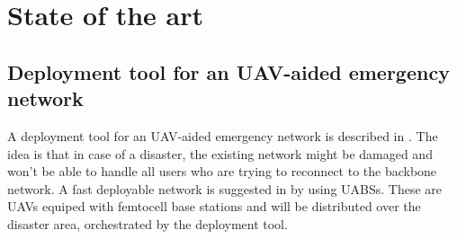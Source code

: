 \chapter{State of the art}
\label{chap:stateoftheart}

\section{Deployment tool for an UAV-aided emergency network}
\label{chap:stateoftheart:deploymenttool}


A deployment tool for an UAV-aided emergency network is described in \cite{J2}. The idea is that in case of a disaster, the existing network might be damaged and won't be able 
to handle all users who are trying to reconnect to the backbone network. A fast deployable network is suggested in \cite{J2} by using \gls{UABS}s. These are UAVs equiped with femtocell base stations
and will be distributed over the disaster area, orchestrated by the deployment tool. 


